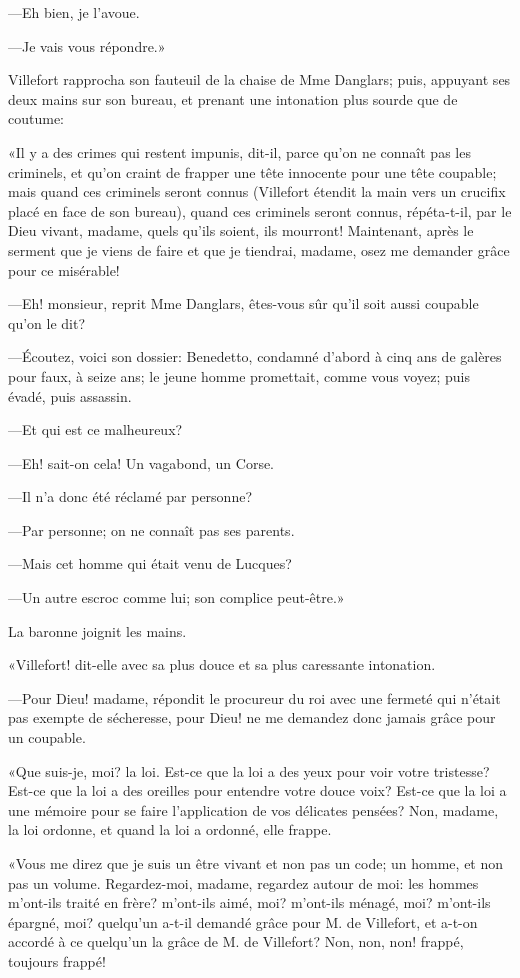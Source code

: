 —Eh bien, je l'avoue. 

—Je vais vous répondre.» 

Villefort rapprocha son fauteuil de la chaise de Mme Danglars; puis, appuyant ses deux mains sur son bureau, et prenant une intonation plus sourde que de coutume: 

«Il y a des crimes qui restent impunis, dit-il, parce qu'on ne connaît pas les criminels, et qu'on craint de frapper une tête innocente pour une tête coupable; mais quand ces criminels seront connus (Villefort étendit la main vers un crucifix placé en face de son bureau), quand ces criminels seront connus, répéta-t-il, par le Dieu vivant, madame, quels qu'ils soient, ils mourront! Maintenant, après le serment que je viens de faire et que je tiendrai, madame, osez me demander grâce pour ce misérable! 

—Eh! monsieur, reprit Mme Danglars, êtes-vous sûr qu'il soit aussi coupable qu'on le dit? 

—Écoutez, voici son dossier: Benedetto, condamné d'abord à cinq ans de galères pour faux, à seize ans; le jeune homme promettait, comme vous voyez; puis évadé, puis assassin. 

—Et qui est ce malheureux? 

—Eh! sait-on cela! Un vagabond, un Corse. 

—Il n'a donc été réclamé par personne? 

—Par personne; on ne connaît pas ses parents. 

—Mais cet homme qui était venu de Lucques? 

—Un autre escroc comme lui; son complice peut-être.» 

La baronne joignit les mains. 

«Villefort! dit-elle avec sa plus douce et sa plus caressante intonation. 

—Pour Dieu! madame, répondit le procureur du roi avec une fermeté qui n'était pas exempte de sécheresse, pour Dieu! ne me demandez donc jamais grâce pour un coupable. 

«Que suis-je, moi? la loi. Est-ce que la loi a des yeux pour voir votre tristesse? Est-ce que la loi a des oreilles pour entendre votre douce voix? Est-ce que la loi a une mémoire pour se faire l'application de vos délicates pensées? Non, madame, la loi ordonne, et quand la loi a ordonné, elle frappe. 

«Vous me direz que je suis un être vivant et non pas un code; un homme, et non pas un volume. Regardez-moi, madame, regardez autour de moi: les hommes m'ont-ils traité en frère? m'ont-ils aimé, moi? m'ont-ils ménagé, moi? m'ont-ils épargné, moi? quelqu'un a-t-il demandé grâce pour M. de Villefort, et a-t-on accordé à ce quelqu'un la grâce de M. de Villefort? Non, non, non! frappé, toujours frappé! 

